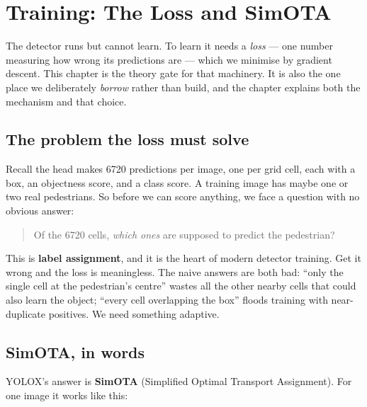 \documentclass[../main.tex]{subfiles}
\begin{document}
\chapter{Training: The Loss and SimOTA}

The detector runs but cannot learn. To learn it needs a \emph{loss} --- one number measuring how
wrong its predictions are --- which we minimise by gradient descent. This chapter is the theory
gate for that machinery. It is also the one place we deliberately \emph{borrow} rather than build,
and the chapter explains both the mechanism and that choice.

\section{The problem the loss must solve}

Recall the head makes 6720 predictions per image, one per grid cell, each with a box, an
objectness score, and a class score. A training image has maybe one or two real pedestrians. So
before we can score anything, we face a question with no obvious answer:

\begin{quote}
Of the 6720 cells, \emph{which ones} are supposed to predict the pedestrian?
\end{quote}

This is \textbf{label assignment}, and it is the heart of modern detector training. Get it wrong
and the loss is meaningless. The naive answers are both bad: ``only the single cell at the
pedestrian's centre'' wastes all the other nearby cells that could also learn the object; ``every
cell overlapping the box'' floods training with near-duplicate positives. We need something
adaptive.

\section{SimOTA, in words}

YOLOX's answer is \textbf{SimOTA} (Simplified Optimal Transport Assignment). For one image it works
like this:
\end{document}
